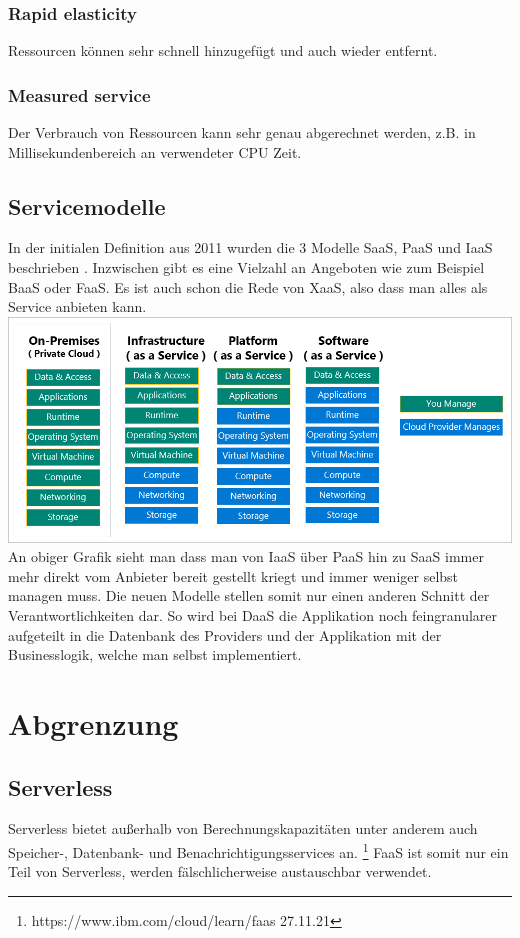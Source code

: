 \documentclass[12pt, a4paper]{article}
\begin{document}
\subsubsection{Rapid elasticity}
Ressourcen können sehr schnell hinzugefügt und auch wieder entfernt.

\subsubsection{Measured service}
Der Verbrauch von Ressourcen kann sehr genau abgerechnet werden, z.B. in Millisekundenbereich an verwendeter CPU Zeit.

\subsection{Servicemodelle}
In der initialen Definition aus 2011 wurden die 3 Modelle \ac{SaaS}, \ac{PaaS} und \ac{IaaS} beschrieben \cite{mell2011nist}. Inzwischen gibt es eine Vielzahl an Angeboten wie zum Beispiel \ac{BaaS} oder \ac{FaaS}. Es ist auch schon die Rede von \ac{XaaS}, also dass man alles als Service anbieten kann.
\includegraphics{cloud_service_models.png}\cite{azure2021microsoft}
An obiger Grafik sieht man dass man von \ac{IaaS} über \ac{PaaS} hin zu \ac{SaaS} immer mehr direkt vom Anbieter bereit gestellt kriegt und immer weniger selbst managen muss.
Die neuen Modelle stellen somit nur einen anderen Schnitt der Verantwortlichkeiten dar. So wird bei \ac{DaaS} die Applikation noch feingranularer aufgeteilt in die Datenbank des Providers und der Applikation mit der Businesslogik, welche man selbst implementiert.

\section{Abgrenzung}

\subsection{Serverless}
Serverless bietet außerhalb von Berechnungskapazitäten unter anderem auch Speicher-, Datenbank- und Benachrichtigungsservices an. \footnote{https://www.ibm.com/cloud/learn/faas 27.11.21}
FaaS ist somit nur ein Teil von Serverless, werden fälschlicherweise austauschbar verwendet.
\end{document}
